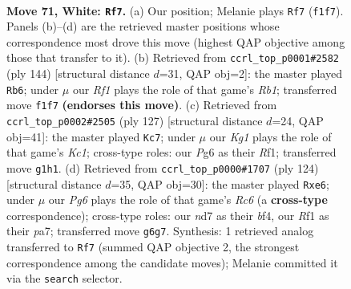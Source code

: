 \documentclass[11pt]{article}
\begin{document}
\clearpage

\begin{figure}[p]\centering
\begin{subfigure}{0.46\textwidth}\centering
\resizebox{\linewidth}{!}{%
\newchessgame
\chessboard[
  setfen={7k/3n4/6P1/8/p1p5/P1P4p/1Br4P/5RK1 w - - 0 71},
  showmover=false,
  pgfstyle=straightmove, color=movearrow, markmove={f1-f7}
]}
\caption{}
\end{subfigure}\hfill
\begin{subfigure}{0.46\textwidth}\centering
\resizebox{\linewidth}{!}{%
\newchessgame
\chessboard[
  setfen={1k6/1P6/3p4/3P3p/5r1P/6p1/6P1/1R4K1 w - - 5 73},
  showmover=false,
  pgfstyle=straightmove, color=movearrow, markmove={b1-b6}
]}
\caption{}
\end{subfigure}
\\[4pt]
\begin{subfigure}{0.46\textwidth}\centering
\resizebox{\linewidth}{!}{%
\newchessgame
\chessboard[
  setfen={2k5/7p/7P/2P1N3/p2Rb3/P2p2K1/8/5r2 b - - 10 64},
  showmover=false,
  pgfstyle=straightmove, color=movearrow, markmove={c8-c7}
]}
\caption{}
\end{subfigure}\hfill
\begin{subfigure}{0.46\textwidth}\centering
\resizebox{\linewidth}{!}{%
\newchessgame
\chessboard[
  setfen={8/p5k1/2R1p1p1/7p/2PrBb1P/5P2/6K1/8 w - - 0 63},
  showmover=false,
  pgfstyle=straightmove, color=movearrow, markmove={c6-e6}
]}
\caption{}
\end{subfigure}
\caption{\textbf{Move 71, White: \texttt{Rf7}.} (a) Our position; Melanie plays \texttt{Rf7} (\texttt{f1f7}). Panels (b)--(d) are the retrieved master positions whose correspondence most drove this move (highest QAP objective among those that transfer to it). (b) Retrieved from \texttt{ccrl\_top\_p0001\#2582} (ply 144) [structural distance $d$=31, QAP obj=2]: the master played \texttt{Rb6}; under $\mu$ our \emph{Rf1} plays the role of that game's \emph{Rb1}; transferred move \texttt{f1f7} \textbf{(endorses this move)}. (c) Retrieved from \texttt{ccrl\_top\_p0002\#2505} (ply 127) [structural distance $d$=24, QAP obj=41]: the master played \texttt{Kc7}; under $\mu$ our \emph{Kg1} plays the role of that game's \emph{Kc1}; cross-type roles: our \emph{P}g6 as their \emph{R}f1; transferred move \texttt{g1h1}. (d) Retrieved from \texttt{ccrl\_top\_p0000\#1707} (ply 124) [structural distance $d$=35, QAP obj=30]: the master played \texttt{Rxe6}; under $\mu$ our \emph{Pg6} plays the role of that game's \emph{Rc6} (a \textbf{cross-type} correspondence); cross-type roles: our \emph{n}d7 as their \emph{b}f4, our \emph{R}f1 as their \emph{p}a7; transferred move \texttt{g6g7}. Synthesis: 1 retrieved analog transferred to \texttt{Rf7} (summed QAP objective 2, the strongest correspondence among the candidate moves); Melanie committed it via the \texttt{search} selector.}
\label{fig:thought-m140}
\end{figure}
\end{document}

